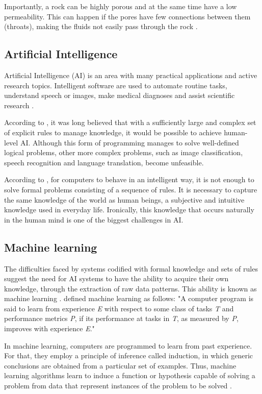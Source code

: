 \documentclass[a4paper,fleqn]{cas-sc}
\begin{document}
Importantly, a rock can be highly porous and at the same time have a low permeability. This can happen if the pores have few connections between them (throats), making the fluids not easily pass through the rock \cite{Buryakovsky2012}.

\subsection{Artificial Intelligence}
Artificial Intelligence (AI) is an area with many practical applications and active research topics. Intelligent software are used to automate routine tasks, understand speech or images, make medical diagnoses and assist scientific research \cite{Goodfellow-et-al-2016}.

According to \cite{chollet2017deep}, it was long believed that with a sufficiently large and complex set of explicit rules to manage knowledge, it would be possible to achieve human-level AI. Although this form of programming manages to solve well-defined logical problems, other more complex problems, such as image classification, speech recognition and language translation, become unfeasible.

According to \cite{Goodfellow-et-al-2016}, for computers to behave in an intelligent way, it is not enough to solve formal problems consisting of a sequence of rules. It is necessary to capture the same knowledge of the world as human beings, a subjective and intuitive knowledge used in everyday life. Ironically, this knowledge that occurs naturally in the human mind is one of the biggest challenges in AI.

\subsection{Machine learning}
The difficulties faced by systems codified with formal knowledge and sets of rules suggest the need for AI systems to have the ability to acquire their own knowledge, through the extraction of raw data patterns. This ability is known as machine learning \cite{Goodfellow-et-al-2016}. \cite{mitchell1997machine} defined machine learning as follows: "A computer program is said to learn from experience \textit{E} with respect to some class of tasks \textit{T} and performance metrics \textit{ P}, if its performance at tasks in \textit{T}, as measured by \textit{P}, improves with experience \textit{E}."

In machine learning, computers are programmed to learn from past experience. For that, they employ a principle of inference called induction, in which generic conclusions are obtained from a particular set of examples. Thus, machine learning algorithms learn to induce a function or hypothesis capable of solving a problem from data that represent instances of the problem to be solved \cite{faceli2011}.
\end{document}
